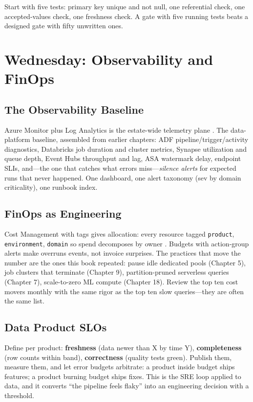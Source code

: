\begin{tipbox}
Start with five tests: primary key unique and not null, one referential check, one accepted-values check, one freshness check. A gate with five running tests beats a designed gate with fifty unwritten ones.
\end{tipbox}

\section{Wednesday: Observability and FinOps}

\subsection{The Observability Baseline}
Azure Monitor plus Log Analytics is the estate-wide telemetry plane \cite{microsoft2025azureMonitor}. The data-platform baseline, assembled from earlier chapters: ADF pipeline/trigger/activity diagnostics, Databricks job duration and cluster metrics, Synapse utilization and queue depth, Event Hubs throughput and lag, ASA watermark delay, endpoint SLIs, and---the one that catches what errors miss---\emph{silence alerts} for expected runs that never happened. One dashboard, one alert taxonomy (sev by domain criticality), one runbook index.

\subsection{FinOps as Engineering}
Cost Management with tags gives allocation: every resource tagged \texttt{product}, \texttt{environment}, \texttt{domain} so spend decomposes by owner \cite{microsoft2025costBudgets}. Budgets with action-group alerts make overruns events, not invoice surprises. The practices that move the number are the ones this book repeated: pause idle dedicated pools (Chapter 5), job clusters that terminate (Chapter 9), partition-pruned serverless queries (Chapter 7), scale-to-zero ML compute (Chapter 18). Review the top ten cost movers monthly with the same rigor as the top ten slow queries---they are often the same list.

\subsection{Data Product SLOs}
Define per product: \textbf{freshness} (data newer than X by time Y), \textbf{completeness} (row counts within band), \textbf{correctness} (quality tests green). Publish them, measure them, and let error budgets arbitrate: a product inside budget ships features; a product burning budget ships fixes. This is the SRE loop applied to data, and it converts ``the pipeline feels flaky'' into an engineering decision with a threshold.

